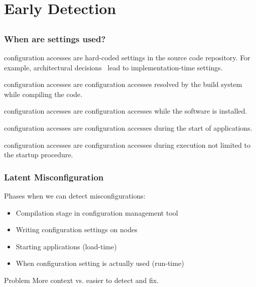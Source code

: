 \section{Early Detection}

\subsection{}

\begin{frame}
	\frametitle{When are settings used?}
	\begin{description}[<+-| alert@+>]
	\item[Implementation-time] configuration accesses 
	are hard-coded settings in the sou\-rce code repository.
	For example, architectural decisions~\cite{zdun2007patterns} lead to impl\-ementation-time settings.

	\item[Compile-time] configuration accesses 
	are configuration accesses resolved by the build system while compiling the code.

	\item[Deployment-time] configuration accesses 
	are configuration accesses while the software is installed.

	\item[Load-time] configuration accesses 
	are configuration accesses during the start of applications.

	\item[Run-time] configuration accesses 
	are configuration accesses during execution not limited to the startup procedure.
	\end{description}
\end{frame}

\begin{frame}
	\frametitle{Latent Misconfiguration}
	Phases when we can detect misconfigurations:
	\begin{itemize}[<+-| alert@+>]
	\item Compilation stage in configuration management tool
	\item Writing configuration settings on nodes
	\item Starting applications (load-time)
	\item When configuration setting is actually used (run-time)
	\end{itemize}

	\pause[\thebeamerpauses]

	\begin{alertblock}{Problem}
	More context vs. easier to detect and fix.
	\end{alertblock}
\end{frame}

